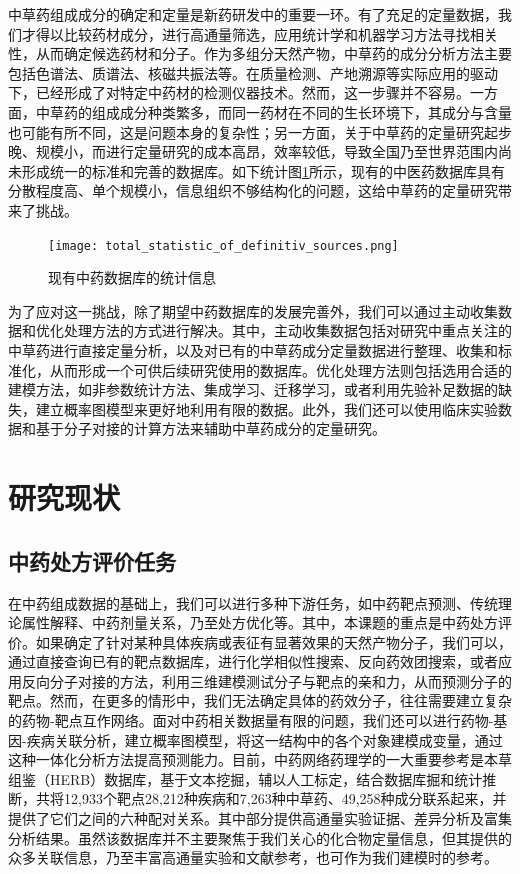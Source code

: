 中草药组成成分的确定和定量是新药研发中的重要一环。有了充足的定量数据，我们才得以比较药材成分，进行高通量筛选，应用统计学和机器学习方法寻找相关性，从而确定候选药材和分子。作为多组分天然产物，中草药的成分分析方法主要包括色谱法、质谱法、核磁共振法等\cite{中药有效部位及成分提取工艺和检测方法_2007}。在质量检测、产地溯源等实际应用的驱动下，已经形成了对特定中药材的检测仪器技术。然而，这一步骤并不容易。一方面，中草药的组成成分种类繁多，而同一药材在不同的生长环境下，其成分与含量也可能有所不同，这是问题本身的复杂性；另一方面，关于中草药的定量研究起步晚、规模小，而进行定量研究的成本高昂，效率较低，导致全国乃至世界范围内尚未形成统一的标准和完善的数据库。如下统计图\ref{fig:statistics}所示，现有的中医药数据库具有分散程度高、单个规模小，信息组织不够结构化的问题，这给中草药的定量研究带来了挑战\cite{Yang_Zhu_Yao_Chen_Chen_Gu_Jiang_Chen_Zhang_Wu_et_al._2023}。

\begin{figure}[H]
  \centering
  \texttt{[image: total\_statistic\_of\_definitiv\_sources.png]}
  \caption{现有中药数据库的统计信息}
  \label{fig:statistics}
\end{figure}


为了应对这一挑战，除了期望中药数据库的发展完善外，我们可以通过主动收集数据和优化处理方法的方式进行解决。其中，主动收集数据包括对研究中重点关注的中草药进行直接定量分析，以及对已有的中草药成分定量数据进行整理、收集和标准化，从而形成一个可供后续研究使用的数据库。优化处理方法则包括选用合适的建模方法，如非参数统计方法、集成学习、迁移学习，或者利用先验补足数据的缺失，建立概率图模型来更好地利用有限的数据。此外，我们还可以使用临床实验数据和基于分子对接的计算方法来辅助中草药成分的定量研究。

\section{研究现状}

\subsection{中药处方评价任务}

在中药组成数据的基础上，我们可以进行多种下游任务，如中药靶点预测、传统理论属性解释、中药剂量关系，乃至处方优化等。其中，本课题的重点是中药处方评价。如果确定了针对某种具体疾病或表征有显著效果的天然产物分子，我们可以，通过直接查询已有的靶点数据库，进行化学相似性搜索、反向药效团搜索，或者应用反向分子对接的方法，利用三维建模测试分子与靶点的亲和力，从而预测分子的靶点。\cite{Huang_Zhang_Zhou_Lin_Chen_Lin_Mai_Huang_2018}然而，在更多的情形中，我们无法确定具体的药效分子，往往需要建立复杂的药物-靶点互作网络。面对中药相关数据量有限的问题，我们还可以进行药物-基因-疾病关联分析，建立概率图模型，将这一结构中的各个对象建模成变量，通过这种一体化分析方法提高预测能力。目前，中药网络药理学的一大重要参考是本草组鉴（HERB）数据库，基于文本挖掘，辅以人工标定，结合数据库掘和统计推断，共将12,933个靶点28,212种疾病和7,263种中草药、49,258种成分联系起来，并提供了它们之间的六种配对关系。其中部分提供高通量实验证据、差异分析及富集分析结果\cite{Fang_Dong_Liu_Guo_Zhao_Zhang_Bu_Liu_Huo_Cao_et_al._2021}。虽然该数据库并不主要聚焦于我们关心的化合物定量信息，但其提供的众多关联信息，乃至丰富高通量实验和文献参考，也可作为我们建模时的参考。

